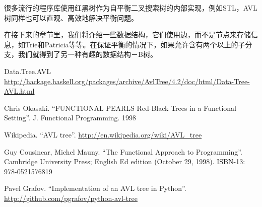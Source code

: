 \documentclass[UTF8]{article}
\begin{document}
很多流行的程序库使用红黑树作为自平衡二叉搜索树的内部实现，例如STL，AVL树同样也可以直观、高效地解决平衡问题。

在接下来的章节里，我们将介绍一些数据结构，它们使用边，而不是节点来存储信息，如Trie和Patricia等等。在保证平衡的情况下，如果允许含有两个以上的子分支，我们就得到了另一种有趣的数据结构－B树。

\ifx\wholebook\relax \else
\begin{thebibliography}{99}

Data.Tree.AVL \url{http://hackage.haskell.org/packages/archive/AvlTree/4.2/doc/html/Data-Tree-AVL.html}

Chris Okasaki. ``FUNCTIONAL PEARLS Red-Black Trees in a Functional Setting''. J. Functional Programming. 1998

Wikipedia. ``AVL tree''. \url{http://en.wikipedia.org/wiki/AVL_tree}

Guy Cousinear, Michel Mauny. ``The Functional Approach to Programming''. Cambridge University Press; English Ed edition (October 29, 1998). ISBN-13: 978-0521576819

Pavel Grafov. ``Implementation of an AVL tree in Python''. \url{http://github.com/pgrafov/python-avl-tree}
\end{thebibliography}
\end{document}
